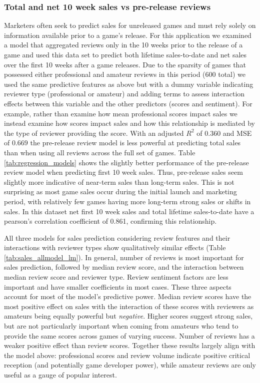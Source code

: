 \documentclass[letterpaper]{article}
\begin{document}
\subsubsection{Total and net 10 week sales vs pre-release reviews}
Marketers often seek to predict sales for unreleased games and must rely solely on information available prior to a game's release. For this application we examined a model that aggregated reviews only in the 10 weeks prior to the release of a game and used this data set to predict both lifetime sales-to-date and net sales over the first 10 weeks after a game releases. Due to the sparsity of games that possessed either professional and amateur reviews in this period (600 total) we used the same predictive features as above but with a dummy variable indicating reviewer type (professional or amateur) and adding terms to assess interaction effects between this variable and the other predictors (scores and sentiment). For example, rather than examine how mean professional scores impact sales we instead examine how scores impact sales and how this relationship is mediated by the type of reviewer providing the score. With an adjusted $R^2$ of $0.360$ and MSE of $0.669$ the pre-release review model is less powerful at predicting total sales than when using all reviews across the full set of games. Table \ref{tab:regression_models} shows the slightly better performance of the pre-release review model when predicting first 10 week sales. Thus, pre-release sales seem slightly more indicative of near-term sales than long-term sales. This is not surprising as most game sales occur during the initial launch and marketing period, with relatively few games having more long-term strong sales or shifts in sales. In this dataset net first 10 week sales and total lifetime sales-to-date have a pearson's correlation coefficient of 0.861, confirming this relationship.

All three models for sales prediction considering review features and their interactions with reviewer types show qualitatively similar effects (Table \ref{tab:sales_allmodel_lm}). In general, number of reviews is most important for sales prediction, followed by median review score, and the interaction between median review score and reviewer type. Review sentiment factors are less important and have smaller coefficients in most cases. These three aspects account for most of the model's predictive power. Median review scores have the most positive effect on sales with the interaction of these scores with reviewers as amateurs being equally powerful but \textit{negative}. Higher scores suggest strong sales, but are not particularly important when coming from amateurs who tend to provide the same scores across games of varying success. Number of reviews has a weaker positive effect than review scores. Together these results largely align with the model above: professional scores and review volume indicate positive critical reception (and potentially game developer power), while amateur reviews are only useful as a gauge of popular interest.
\end{document}

